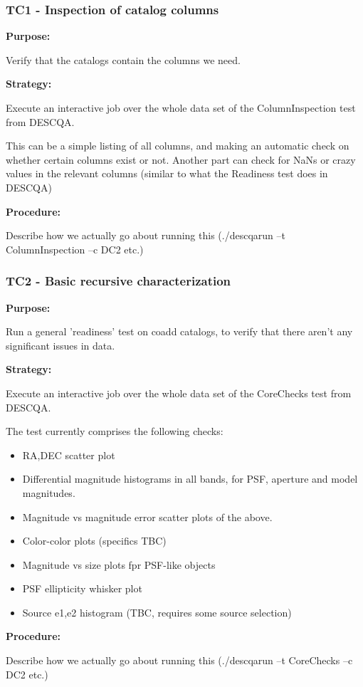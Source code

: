 \documentclass[12pt, a4paper]{article}
\begin{document}
\subsubsection{TC1 - Inspection of catalog columns}
\textbf{Purpose:} 

Verify that the catalogs contain the columns we need.

\textbf{Strategy:} 

Execute an interactive job over the whole data set of the ColumnInspection test from DESCQA.

This can be a simple listing of all columns, and making an automatic check on whether certain columns exist or not. 
Another part can check for NaNs or crazy values in the relevant columns (similar to what the Readiness test does in DESCQA)

\textbf{Procedure:} 

Describe how we actually go about running this (./descqarun --t ColumnInspection --c DC2 etc.)

\subsubsection{TC2 - Basic recursive characterization}
\textbf{Purpose:} 

Run a general 'readiness' test on coadd catalogs, to verify that there aren't any significant issues in data. 

\textbf{Strategy:} 

Execute an interactive job over the whole data set of the CoreChecks test from DESCQA.

The test currently comprises the following checks:
\begin{itemize}
	\item RA,DEC scatter plot
	\item Differential magnitude histograms in all bands, for PSF, aperture and model magnitudes.
	\item Magnitude vs magnitude error scatter plots of the above.
	\item Color-color plots (specifics TBC)
	\item Magnitude vs size plots fpr PSF-like objects
	\item PSF ellipticity whisker plot
	\item Source e1,e2 histogram (TBC, requires some source selection)
\end{itemize}

\textbf{Procedure:} 

Describe how we actually go about running this (./descqarun --t CoreChecks --c DC2 etc.)
\end{document}
